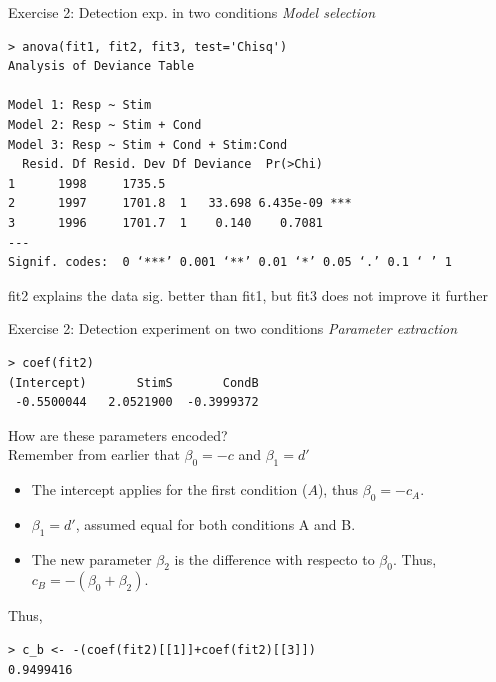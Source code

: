 \documentclass[10pt]{beamer}
\begin{document}
\begin{frame}[fragile]{Exercise 2: Detection exp. in two conditions}
\textit{Model selection}

\begin{verbatim}
> anova(fit1, fit2, fit3, test='Chisq')
Analysis of Deviance Table

Model 1: Resp ~ Stim
Model 2: Resp ~ Stim + Cond
Model 3: Resp ~ Stim + Cond + Stim:Cond
  Resid. Df Resid. Dev Df Deviance  Pr(>Chi)    
1      1998     1735.5                          
2      1997     1701.8  1   33.698 6.435e-09 ***
3      1996     1701.7  1    0.140    0.7081    
---
Signif. codes:  0 ‘***’ 0.001 ‘**’ 0.01 ‘*’ 0.05 ‘.’ 0.1 ‘ ’ 1
\end{verbatim}



\alert{fit2 explains the data sig. better than fit1, but fit3 does not improve it further}
\end{frame}

\begin{frame}[fragile]{Exercise 2: Detection experiment on two conditions}
\textit{Parameter extraction}
\begin{verbatim}
> coef(fit2)
(Intercept)       StimS       CondB 
 -0.5500044   2.0521900  -0.3999372 
\end{verbatim}

How are these parameters encoded?\\[10pt]
\pause
Remember from earlier that $\beta_0 = -c$ and $\beta_1 = d'$\\[5pt]

\begin{itemize}
\item The intercept applies for the first condition ($A$), thus
$\beta_0 = -c_A$.
\item $\beta_1 = d'$, assumed equal for both conditions A and B.
\item The new parameter $\beta_2$ is the difference with respecto to $\beta_0$. Thus, $c_B = - (\beta_0 + \beta_2)$.
\end{itemize}

Thus,
\begin{verbatim}
> c_b <- -(coef(fit2)[[1]]+coef(fit2)[[3]])
0.9499416
\end{verbatim}
\end{frame}
\end{document}
